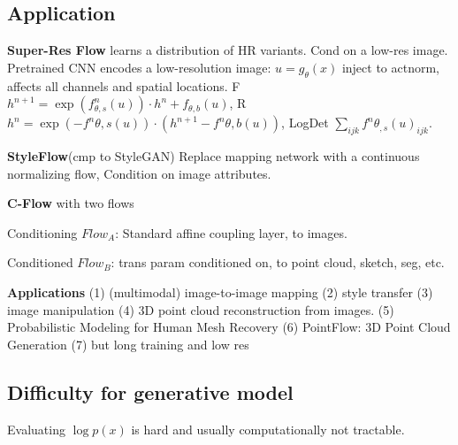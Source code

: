 \subsection*{Application}

\textbf{Super-Res Flow} learns a distribution of HR variants. Cond on a low-res image.  Pretrained CNN encodes a low-resolution image: \({u}=g_{\theta}({x})\) inject to actnorm, affects all channels and spatial locations. \textsf{F} \({h}^{n+1}=\exp (f_{{\theta}, s}^{n}({u})) \cdot {h}^{n}+f_{{\theta}, b}({u})\), \textsf{R} \({h}^{n}=\exp (-f^{n} {\theta}, s({u})) \cdot({h}^{n+1}-f^{n} {\theta}, b({u}))\), \textsf{LogDet} \(\sum_{i j k} f^{n} {\theta}_{, s}({u})_{i j k}\).


\textbf{StyleFlow}(cmp to StyleGAN) Replace mapping network with a continuous normalizing flow, Condition on image attributes.


\textbf{C-Flow} with two flows

Conditioning \(Flow_A\): Standard affine coupling layer, to images.

Conditioned \(Flow_B\): trans param conditioned on, to point cloud, sketch, seg, etc.

\textbf{Applications} (1) (multimodal) image-to-image mapping (2) style transfer (3) image manipulation (4) 3D point cloud reconstruction from images. (5) Probabilistic Modeling for Human Mesh Recovery (6) PointFlow: 3D Point Cloud Generation (7) but long training and low res

\subsection*{Difficulty for generative model}
Evaluating \(\log p(x)\) is hard and usually computationally not tractable.
